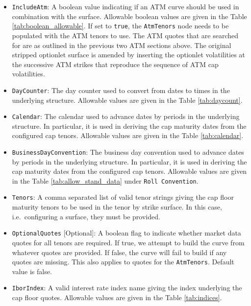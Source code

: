 \begin{itemize}
\item \lstinline!IncludeAtm!:
A boolean value indicating if an ATM curve should be used in combination with the surface. Allowable boolean values are given in the Table \ref{tab:boolean_allowable}. If set to \lstinline!true!, the \lstinline!AtmTenors! node needs to be populated with the ATM tenors to use. The ATM quotes that are searched for are as outlined in the previous two ATM sections above. The original stripped optionlet surface is amended by inserting the optionlet volatilities at the successive ATM strikes that reproduce the sequence of ATM cap volatilities.

\item \lstinline!DayCounter!:
The day counter used to convert from dates to times in the underlying structure. Allowable values are given in the Table \ref{tab:daycount}.

\item \lstinline!Calendar!:
The calendar used to advance dates by periods in the underlying structure. In particular, it is used in deriving the cap maturity dates from the configured cap tenors. Allowable values are given in the Table \ref{tab:calendar}.

\item \lstinline!BusinessDayConvention!:
The business day convention used to advance dates by periods in the underlying structure. In particular, it is used in deriving the cap maturity dates from the configured cap tenors. Allowable values are given in the Table \ref{tab:allow_stand_data} under \lstinline!Roll Convention!.

\item \lstinline!Tenors!:
A comma separated list of valid tenor strings giving the cap floor maturity tenors to be used in the tenor by strike surface. In this case, i.e.\ configuring a surface, they must be provided.

\item \lstinline!OptionalQuotes! [Optional]:
A boolean flag to indicate whether market data quotes for all tenors are required. If true, we attempt to build the curve from whatever quotes are provided. If false, the curve will fail to build if any quotes are missing. This also applies to quotes for the \lstinline!AtmTenors!. Default value is false.

\item \lstinline!IborIndex!:
A valid interest rate index name giving the index underlying the cap floor quotes. Allowable values are given in the Table \ref{tab:indices}.


\end{itemize}
